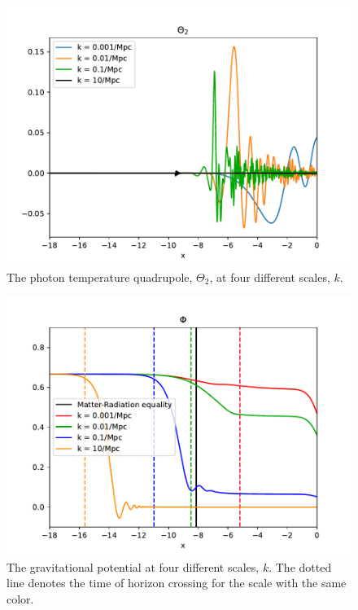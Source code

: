 \documentclass{aa}
\begin{document}
\begin{figure}[h!]
   \hspace{-1cm}   
   \includegraphics[scale=0.65]{../figures/milestone3/theta_2.pdf}
   \caption{The photon temperature quadrupole, $\Theta_2$, at four different scales, $k$.}\label{fig:theta2}
\end{figure}

\begin{figure}[h!]
   \includegraphics[scale=0.6]{../figures/milestone3/phi.pdf}
   \caption{The gravitational potential at four different scales, $k$. The dotted line denotes the time of horizon crossing for the scale with the same color.}\label{fig:phi}
\end{figure}
\end{document}

